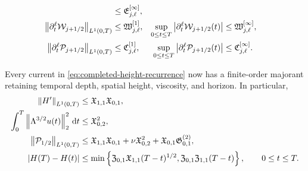 {\begin{theorem}
\begin{samepage}
\begin{align}
 &\le\mathfrak E_{j,\ell}^{[\infty]},
 \label{eq:qc-sharp-energy-row-family}\\
 \left\lVert \partial_t^\ell\mathcal W_{j+1/2}\right\rVert_{L^1(0,T)}
 &\le\mathfrak W_{j,\ell}^{[1]},
 &
 \sup_{0\le t\le T}
 \left|\partial_t^\ell\mathcal W_{j+1/2}(t)\right|
 &\le\mathfrak W_{j,\ell}^{[\infty]},
 \label{eq:qc-sharp-force-work-row-family}\\
 \left\lVert \partial_t^\ell\mathcal P_{j+1/2}\right\rVert_{L^1(0,T)}
 &\le\mathfrak C_{j,\ell}^{[1]},
 &
 \sup_{0\le t\le T}
 \left|\partial_t^\ell\mathcal P_{j+1/2}(t)\right|
 &\le\mathfrak C_{j,\ell}^{[\infty]}.
 \label{eq:qc-sharp-production-row-family}
\end{align}
\end{samepage}
Every current in \eqref{eq:completed-height-recurrence} now has a
finite-order majorant retaining temporal depth, spatial height, viscosity,
and horizon.
In particular,
\begin{align}
 \left\lVert H'\right\rVert_{L^1(0,T)}
 &\le\mathfrak X_{1,1}\mathfrak X_{0,1},
 \label{eq:qc-sharp-height-variation}\\
 \int_0^T\left\lVert \Lambda^{3/2}u(t)\right\rVert_2^2\,\mathrm d t
 &\le\mathfrak X_{0,2}^2,
 \label{eq:qc-sharp-critical-dissipation}\\
 \left\lVert \mathcal P_{1/2}\right\rVert_{L^1(0,T)}
 &\le\mathfrak X_{1,1}\mathfrak X_{0,1}
 +\nu\mathfrak X_{0,2}^2
 +\mathfrak X_{0,1}\mathfrak G^{(2)}_{0,1},
 \label{eq:qc-sharp-critical-current}\\
 |H(T)-H(t)|
 &\le\min\left\{
 \mathfrak Z_{0,1}\mathfrak X_{1,1}(T-t)^{1/2},
 \mathfrak Z_{0,1}\mathfrak Z_{1,1}(T-t)
 \right\},
 \qquad 0\le t\le T.
 \label{eq:qc-sharp-critical-modulus}
\end{align}


\end{theorem}}
